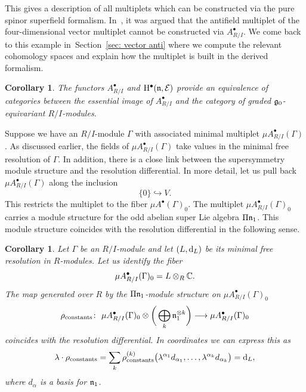 \documentclass[pdftex]{sigma}
\numberwithin{equation}{section}
\newtheorem{cor}[thm]{Corollary}
\def\cE{\mathcal E}\def\cF{\mathcal F}\def\cG{\mathcal G}\def\cH{\mathcal H}
\def\d{{\rm d}}
\begin{document}
This gives a description of all multiplets which can be constructed via the pure spinor superfield formalism. In~\cite{perspectives}, it was argued that the antifield multiplet of the four-dimensional vector multiplet cannot be constructed via $A^\bullet_{R/I}$. We come back to this example in~Section~\ref{sec: vector anti} where we compute the relevant cohomology spaces and explain how the multiplet is built in the derived formalism.

\begin{cor}
	The functors $A^\bullet_{R/I}$ and $\mathrm H^\bullet(\fn , \cE)$ provide an equivalence of categories between the essential image of $A^\bullet_{R/I}$ and the category of graded $\mathfrak g_0$-equivariant $R/I$-modules.
\end{cor}

Suppose we have an $R/I$-module $\Gamma$ with associated minimal multiplet $\mu A_{R/I}^\bullet(\Gamma)$. As discussed earlier, the fields of $\mu A_{R/I}^\bullet(\Gamma)$ take values in the minimal free resolution of $\Gamma$. In addition, there is a close link between the supersymmetry module structure and the resolution differential. In more detail, let us pull back $\mu A_{R/I}^\bullet(\Gamma)$ along the inclusion
\begin{equation*}
\{0\} \hookrightarrow V .
\end{equation*}
This restricts the multiplet to the fiber $\mu A^\bullet(\Gamma)_0$. The multiplet $\mu A_{R/I}^\bullet(\Gamma)_0$ carries a module structure for the odd abelian super Lie algebra $\Pi \mathfrak n_1$. This module structure coincides with the resolution differential in the following sense.

\begin{cor} \label{cor: susy trafo}
	Let $\Gamma$ be an $R/I$-module and let $(L,\d_L)$ be its minimal free resolution in $R$-modules. Let us identify the fiber
	\begin{equation*}
	\mu A_{R/I}^\bullet(\Gamma)_0 = L \otimes_R \mathbb C.
	\end{equation*}
	The map generated over $R$ by the $\Pi \mathfrak n_1$-module structure on $\mu A_{R/I}^\bullet(\Gamma)_0$
	\begin{equation*}
	\rho_{\mathrm{constants}} \colon \ \mu A^\bullet_{R/I}(\Gamma)_0 \otimes \bigg(\bigoplus_k \mathfrak n_1^{\otimes k}\bigg) \longrightarrow \mu A^\bullet_{R/I}(\Gamma)_0
	\end{equation*}
	coincides with the resolution differential. In coordinates we can express this as
	\begin{equation*}
	\lambda \cdot \rho_{\mathrm{constants}} = \sum_k \rho_{\mathrm{constants}}^{(k)} \big(\lambda^{\alpha_1} d_{\alpha_1}, \dots , \lambda^{\alpha_k} d_{\alpha_k}\big) = \d_L,
	\end{equation*}
	where $d_\alpha$ is a basis for $\mathfrak n_1$.
\end{cor}
\end{document}
